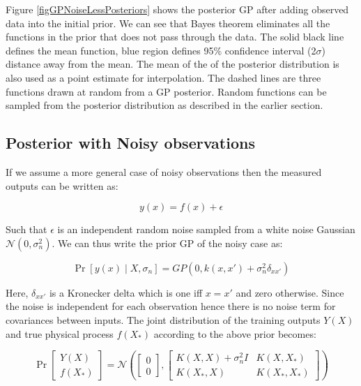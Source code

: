 Figure \ref{figGPNoiseLessPosteriors} shows the posterior GP after adding observed data into the initial prior. We can see that Bayes theorem eliminates all the functions in the prior that does not pass through the data. The solid black line defines the mean function, blue region defines 95\% confidence interval (2\(\sigma\)) distance away from the mean. The mean of the of the posterior distribution is also used as a point estimate for interpolation. The dashed lines are three functions drawn at random from a GP posterior. Random functions can be sampled from the posterior distribution as described in the earlier section. 

\subsection{Posterior with Noisy observations}\label{subSecPosteriorNoisy}
If we assume a more general case of noisy observations then the measured outputs can be written as:

\begin{equation}\label{eqNoiseEquation}
y(x) = f(x) + \epsilon
\end{equation}

Such that \(\epsilon\) is an independent random noise sampled from a white noise Gaussian \(\mathcal{N}(0, \sigma_{n}^{2})\). We can thus write the prior GP of the noisy case as:

\begin{equation}\label{equationMeanZeroGPNoisydefinition}
\Pr[y(x) \mid X, \sigma_{n}] = GP(0 , k(x, x') + \sigma^{2}_{n}\delta_{xx'})
\end{equation}

Here, \(\delta_{xx'}\) is a Kronecker delta which is one iff \(x = x'\) and zero otherwise. Since the noise is independent for each observation hence there is no noise term for covariances between inputs. The joint distribution of the training outputs \(Y(X)\) and true physical process \(f(X_{*})\) according to the above prior becomes:

\begin{equation}\label{equationJointPriorNoisy}
\Pr\left [ \begin{matrix}
Y(X)
\\ f(X_{*})
\end{matrix} \right ]
= 
\mathcal{N}\left (
\left [ \begin{matrix}
0
\\ 0

\end{matrix} \right ] , \left [ \begin{matrix}
K(X, X) + \sigma^{2}_{n}I & K(X, X_{*})\\ 
K(X_{*}, X) & K(X_{*}, X_{*})
\end{matrix} \right ] 
\right )
\end{equation}

